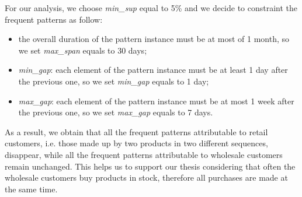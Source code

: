 For our analysis, we choose \emph{min\_sup} equal to 5\% and we decide to constraint the frequent patterns as follow: 

\begin{itemize}
\item the overall duration of the pattern instance must be at most of 1 month, so we set \emph{max\_span} equals to 30 days;
\item \emph{min\_gap}: each element of the pattern instance must be at least 1 day after the previous one, so we set \emph{min\_gap} equals to 1 day;
\item \emph{max\_gap}: each element of the pattern instance must be at most 1 week after the previous one, so we set \emph{max\_gap} equals to 7 days.
\end{itemize}

As a result, we obtain that all the frequent patterns attributable to retail customers, i.e. those made up by two products in two different sequences, disappear, while all the frequent patterns attributable to wholesale customers remain unchanged. This helps us to support our thesis considering that often the wholesale customers buy products in stock, therefore all purchases are made at the same time.
